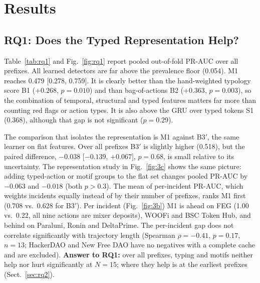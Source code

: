 \section{Results}
\label{sec:results}

\subsection{RQ1: Does the Typed Representation Help?}
\label{sec:rq1}

Table~\ref{tab:rq1} and Fig.~\ref{fig:rq1} report pooled out-of-fold PR-AUC over all prefixes.
All learned detectors are far above the prevalence floor (0.054).
M1 reaches 0.479 [0.278, 0.759].
It is clearly better than the hand-weighted typology score B1 ($+0.268$, $p=0.010$) and than bag-of-actions B2 ($+0.363$, $p=0.003$), so the combination of temporal, structural and typed features matters far more than counting red flags or action types.
It is also above the GRU over typed tokens S1 (0.368), although that gap is not significant ($p=0.29$).

The comparison that isolates the representation is M1 against B3$'$, the same learner on flat features.
Over all prefixes B3$'$ is slightly higher (0.518), but the paired difference, $-0.038$ [$-0.139$, $+0.067]$, $p=0.68$, is small relative to its uncertainty.
The representation study in Fig.~\ref{fig:3c} shows the same picture: adding typed-action or motif groups to the flat set changes pooled PR-AUC by $-0.063$ and $-0.018$ (both $p>0.3$).
The mean of per-incident PR-AUC, which weights incidents equally instead of by their number of prefixes, ranks M1 first (0.708 vs.\ 0.628 for B3$'$).
Per incident (Fig.~\ref{fig:3b}) M1 is ahead on FEG (1.00 vs.\ 0.22, all nine actions are mixer deposits), WOOFi and BSC Token Hub, and behind on Paraluni, Ronin and DeltaPrime.
The per-incident gap does not correlate significantly with trajectory length (Spearman $\rho=-0.41$, $p=0.17$, $n=13$; HackerDAO and New Free DAO have no negatives with a complete cache and are excluded).
\textbf{Answer to RQ1:} over all prefixes, typing and motifs neither help nor hurt significantly at $N=15$; where they help is at the earliest prefixes (Sect.~\ref{sec:rq2}).

